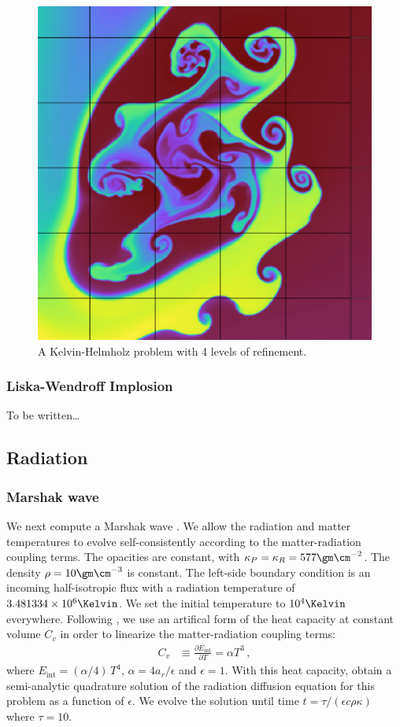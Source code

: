 \documentclass[fleqn,usenatbib]{mnras}
\begin{document}
\begin{figure}
    \includegraphics[width=0.9\columnwidth]{quokka_zoom2.pdf}
    \caption{A Kelvin-Helmholz problem with 4 levels of refinement.}
    \label{fig:kh_zoom}
\end{figure}

\subsubsection{Liska-Wendroff Implosion}
To be written\dots

\subsection{Radiation}
\label{ssec:radiation_tests}

\subsubsection{Marshak wave}
We next compute a Marshak wave \citep{Marshak_1958}. We allow the radiation and matter temperatures to evolve self-consistently according to the matter-radiation coupling terms. The opacities are constant, with $\kappa_P = \kappa_R = 577 \gm \cm^{-2}$. The density $\rho = 10 \gm \cm^{-3}$ is constant. The left-side boundary condition is an incoming half-isotropic flux with a radiation temperature of $3.481334 \times 10^6 \Kelvin$. We set the initial temperature to $10^4 \Kelvin$ everywhere. Following \cite{Su_1996}, we use an artifical form of the heat capacity at constant volume $C_v$ in order to linearize the matter-radiation coupling terms:
\begin{align}
C_v &\equiv \frac{\partial E_{\text{int}}}{\partial T} = \alpha T^3 \, ,
\label{eq:heat_capacity}
\end{align}
where $E_{\text{int}} = (\alpha / 4) \, T^4$, $\alpha = 4 a_r / \epsilon$ and $\epsilon = 1$. With this heat capacity, \cite{Su_1996} obtain a semi-analytic quadrature solution of the radiation diffusion equation for this problem as a function of $\epsilon$. We evolve the solution until time $t = \tau / (\epsilon c \rho \kappa)$ where $\tau = 10$.
\end{document}
